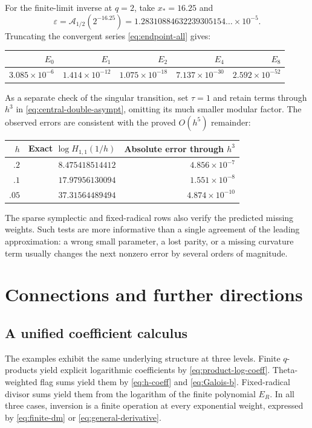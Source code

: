 \documentclass[11pt]{article}
\numberwithin{equation}{section}
\theoremstyle{definition}
\newcommand{\eps}{\varepsilon}
\begin{document}
For the finite-limit inverse at $q=2$, take $x_*=16.25$ and
\[
 \eps=\mathcal A_{1/2}(2^{-16.25})
      =1.28310884632239305154\ldots\times10^{-5}.
\]
Truncating the convergent series \eqref{eq:endpoint-all} gives:
\begin{center}
\begin{tabular}{@{}rrrrr@{}}
\toprule
$E_0$ & $E_1$ & $E_2$ & $E_4$ & $E_8$\\
\midrule
$3.085\times10^{-6}$ & $1.414\times10^{-12}$ & $1.075\times10^{-18}$ & $7.137\times10^{-30}$ & $2.592\times10^{-52}$ \\
\bottomrule
\end{tabular}
\end{center}

As a separate check of the singular transition, set $\tau=1$ and retain
terms through $h^3$ in \eqref{eq:central-double-asympt}, omitting its much
smaller modular factor. The observed errors are consistent with the proved
$O(h^5)$ remainder:
\begin{center}
\begin{tabular}{@{}rrr@{}}
\toprule
$h$ & Exact $\log H_{1,1}(1/h)$ & Absolute error through $h^3$\\
\midrule
$.2$ & $8.475418514412$ & $4.856\times10^{-7}$ \\
$.1$ & $17.97956130094$ & $1.551\times10^{-8}$ \\
$.05$ & $37.31564489494$ & $4.874\times10^{-10}$ \\
\bottomrule
\end{tabular}
\end{center}

The sparse symplectic and fixed-radical rows also verify the predicted missing
weights. Such tests are more informative than a single agreement of the
leading approximation: a wrong small parameter, a lost parity, or a missing
curvature term usually changes the next nonzero error by several orders of
magnitude.

\section{Connections and further directions}
\label{sec:conclusion}

\subsection{A unified coefficient calculus}

The examples exhibit the same underlying structure at three levels. Finite $q$-products yield explicit logarithmic coefficients by \eqref{eq:product-log-coeff}. Theta-weighted flag sums yield them by \eqref{eq:h-coeff} and \eqref{eq:Galois-b}. Fixed-radical divisor sums yield them from the logarithm of the finite polynomial $E_R$. In all three cases, inversion is a finite operation at every exponential weight, expressed by \eqref{eq:finite-dm} or \eqref{eq:general-derivative}.
\end{document}
